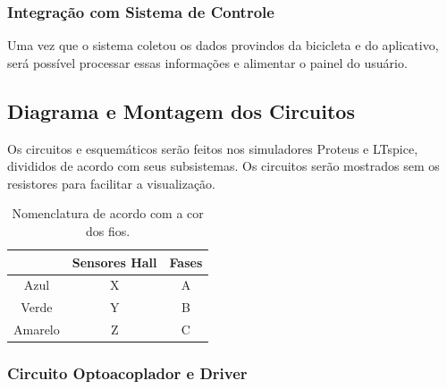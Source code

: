 		\subsubsection{Integração com Sistema de Controle}
		Uma vez que o sistema coletou os dados provindos da bicicleta e do aplicativo, será possível processar essas informações e alimentar o painel do usuário.


	\subsection{Diagrama e Montagem dos Circuitos}
	Os circuitos e esquemáticos serão feitos nos simuladores Proteus e LTspice, divididos de acordo com seus subsistemas. Os circuitos serão mostrados sem os resistores para facilitar a visualização.
		
	\begin{table}[H]
		\caption{Nomenclatura de acordo com a cor dos fios.}
		\centering
		\label{Nomenclatura_de_acordo_com_a_cor_dos_fios}
		\begin{tabular}{ccc}
			\cline{2-3} & Sensores Hall & Fases \\ \hline
			Azul & X & A \\ \hline
			Verde & Y & B \\ \hline
			Amarelo & Z & C \\ \hline
		\end{tabular}
	\end{table}
	

	
		\subsubsection{Circuito Optoacoplador e Driver}
		
